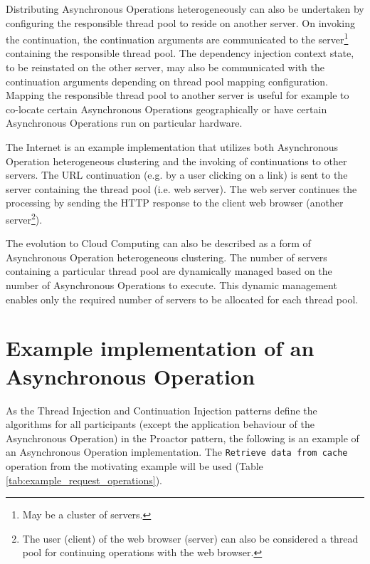\documentclass[prodmode]{style/acmlarge}
\begin{document}
Distributing Asynchronous Operations heterogeneously can also be undertaken by
configuring the responsible thread pool to reside on another server.  On
invoking the continuation, the continuation arguments are communicated to the
server\footnote{May be a cluster of servers.} containing the responsible thread
pool.  The dependency injection context state, to be reinstated on the other
server, may also be communicated with the continuation arguments depending on
thread pool mapping configuration.  Mapping the responsible thread pool to
another server is useful for example to co-locate certain Asynchronous
Operations geographically or have certain Asynchronous Operations run on
particular hardware.

The Internet is an example implementation that utilizes both Asynchronous
Operation heterogeneous clustering and the invoking of continuations to other
servers.  The URL continuation (e.g. by a user clicking on a link) is sent to
the server containing the thread pool (i.e. web server).  The web server
continues the processing by sending the HTTP response to the client web browser
(another server\footnote{The user (client) of the web browser (server) can also
be considered a thread pool for continuing operations with the web browser.}).

The evolution to Cloud Computing can also be described as a form of Asynchronous
Operation heterogeneous clustering.  The number of servers containing a
particular thread pool are dynamically managed based on the number of
Asynchronous Operations to execute.  This dynamic management enables only the
required number of servers to be allocated for each thread pool.


\section{Example implementation of an Asynchronous Operation}

As the Thread Injection and Continuation Injection patterns define the
algorithms for all participants (except the application behaviour of the
Asynchronous Operation) in the Proactor pattern, the following is an example of
an Asynchronous Operation implementation.  The \texttt{Retrieve data from cache}
operation from the motivating example will be used (Table
\ref{tab:example_request_operations}).
\end{document}
